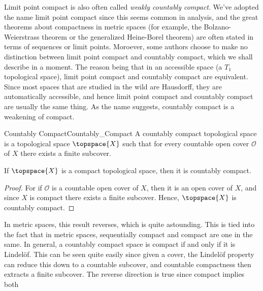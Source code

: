 \documentclass{book}                                                           %
\begin{document}
            Limit point compact is also often called
            \textit{weakly countably compact}. We've adopted the name limit point
            compact since this seems common in analysis, and the great theorems
            about compactness in metric spaces (for example, the Bolzano-Weierstrass
            theorem or the generalized Heine-Borel theorem) are often stated in
            terms of sequences or limit points. Moroever, some authors choose to
            make no distinction between limit point compact and countably compact,
            which we shall describe in a moment. The reason being that in an
            accessible space (a $T_{1}$ topological space), limit point compact and
            countably compact are equivalent. Since most spaces that are studied in
            the wild are Hausdorff, they are automatically accessible, and hence
            limit point compact and countably compact are usually the same thing.
            As the name suggests, countably compact is a weakening of compact.
            \begin{fdefinition}{Countably Compact}{Countably_Compact}
                A countably compact topological space is a topological space
                $\topspace{X}$ such that for every countable open cover
                $\mathcal{O}$ of $X$ there exists a finite subcover.
            \end{fdefinition}
            \begin{theorem}
                If $\topspace{X}$ is a compact topological space, then it is
                countably compact.
            \end{theorem}
            \begin{proof}
                For if $\mathcal{O}$ is a countable open cover of $X$, then it is
                an open cover of $X$, and since $X$ is compact there exists a finite
                subcover. Hence, $\topspace{X}$ is countably compact.
            \end{proof}
            In metric spaces, this result reverses, which is quite astounding. This
            is tied into the fact that in metric spaces, sequentially compact and
            compact are one in the same. In general, a countably compact space is
            compact if and only if it is Lindel\"{o}f. This can be seen quite easily
            since given a cover, the Lindel\"{o}f property can reduce this down to
            a countable subcover, and countable compactness then extracts a finite
            subcover. The reverse direction is true since compact implies both
\end{document}
